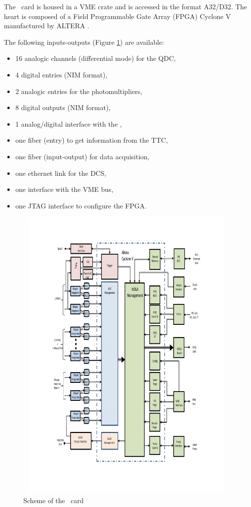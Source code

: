 The \lascar~card is housed in a VME crate and is accessed in the format A32/D32. The heart is composed of a Field Programmable Gate Array (FPGA) Cyclone V manufactured by ALTERA \cite{ref:altera-cyclone}.

The following inputs-outputs (Figure \ref{fig:laslascarlinks}) are available:
\begin{itemize}
\item 16 analogic channels (differential mode) for the QDC,
\item 4 digital entries (NIM format),
\item 2 analogic entries for the photomultipliers,
\item 8 digital outputs (NIM format),
\item 1 analog/digital interface with the \las,
\item one fiber (entry) to get information from the TTC,
\item one fiber (input-output) for data acquisition,
\item one ethernet link for the DCS,
\item one interface with the VME bus,
\item one JTAG interface to configure the FPGA.

\end{itemize}

\begin{figure}[htbp]

\centering
\includegraphics[height=15cm,width=15cm]{figures/Lascarlinks.pdf}
\caption{Scheme of the \lascar~card}\label{fig:laslascarlinks}
\end{figure}


